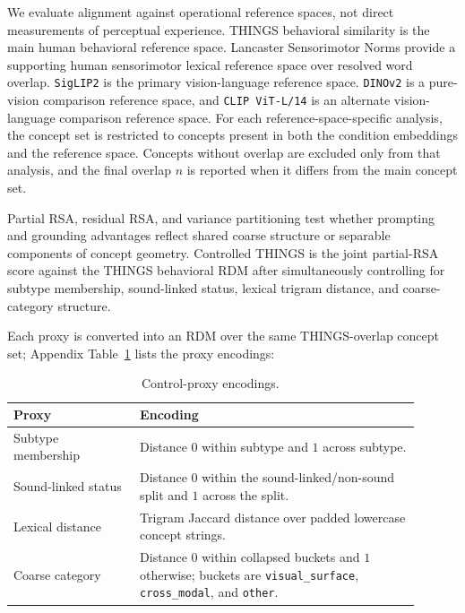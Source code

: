 \documentclass{article}
\begin{document}
We evaluate alignment against operational reference spaces, not direct measurements of perceptual experience. THINGS behavioral similarity is the main human behavioral reference space. Lancaster Sensorimotor Norms provide a supporting human sensorimotor lexical reference space over resolved word overlap. \texttt{SigLIP2} is the primary vision-language reference space. \texttt{DINOv2} is a pure-vision comparison reference space, and \texttt{CLIP ViT-L/14} is an alternate vision-language comparison reference space. For each reference-space-specific analysis, the concept set is restricted to concepts present in both the condition embeddings and the reference space. Concepts without overlap are excluded only from that analysis, and the final overlap \(n\) is reported when it differs from the main concept set.

Partial RSA, residual RSA, and variance partitioning test whether prompting and grounding advantages reflect shared coarse structure or separable components of concept geometry. Controlled THINGS is the joint partial-RSA score against the THINGS behavioral RDM after simultaneously controlling for subtype membership, sound-linked status, lexical trigram distance, and coarse-category structure.

Each proxy is converted into an RDM over the same THINGS-overlap concept set; Appendix Table~\ref{tab:appendix_proxy_encodings} lists the proxy encodings:
\begin{table}[!htbp]
\centering
\caption{Control-proxy encodings.}
\label{tab:appendix_proxy_encodings}
\small
\begin{tabular}{p{0.28\linewidth}p{0.62\linewidth}}
\toprule
Proxy & Encoding \\
\midrule
Subtype membership & Distance \(0\) within subtype and \(1\) across subtype. \\
Sound-linked status & Distance \(0\) within the sound-linked/non-sound split and \(1\) across the split. \\
Lexical distance & Trigram Jaccard distance over padded lowercase concept strings. \\
Coarse category & Distance \(0\) within collapsed buckets and \(1\) otherwise; buckets are \texttt{visual\_surface}, \texttt{cross\_modal}, and \texttt{other}. \\
\bottomrule
\end{tabular}
\end{table}
\end{document}
